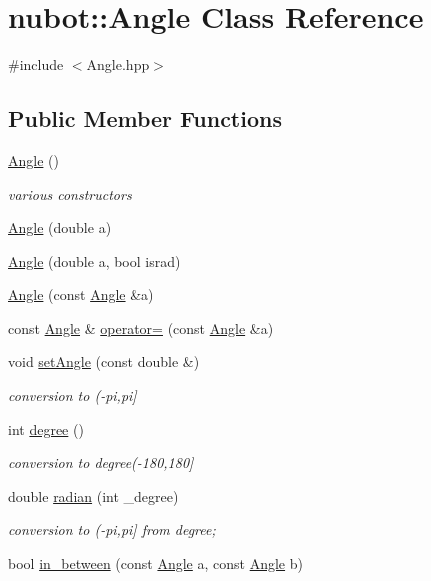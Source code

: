 \hypertarget{classnubot_1_1Angle}{\section{nubot\-:\-:Angle Class Reference}
\label{classnubot_1_1Angle}
}


{\ttfamily \#include $<$Angle.\-hpp$>$}

\subsection*{Public Member Functions}
\begin{DoxyCompactItemize}
\item 
\hyperlink{classnubot_1_1Angle_a5dfacaad5e9ae217f95f4bcfc7de2d44}{Angle} ()
\begin{DoxyCompactList}\small\item\em various constructors \end{DoxyCompactList}\item 
\hyperlink{classnubot_1_1Angle_a65d4bada1d5dfcfa82e9d8b88301ea61}{Angle} (double a)
\item 
\hyperlink{classnubot_1_1Angle_a11d992adb4281a30fa4a969872641e1c}{Angle} (double a, bool israd)
\item 
\hyperlink{classnubot_1_1Angle_ae4a2ecd3e7ee97c16f3c78f4f6a877bf}{Angle} (const \hyperlink{classnubot_1_1Angle}{Angle} \&a)
\item 
const \hyperlink{classnubot_1_1Angle}{Angle} \& \hyperlink{classnubot_1_1Angle_ac5eac9e017f5dc873bd41891640471ca}{operator=} (const \hyperlink{classnubot_1_1Angle}{Angle} \&a)
\item 
void \hyperlink{classnubot_1_1Angle_aa8eaad3a2a82d79456ed326ddbba141f}{set\-Angle} (const double \&)
\begin{DoxyCompactList}\small\item\em conversion to (-\/pi,pi\mbox{]} \end{DoxyCompactList}\item 
int \hyperlink{classnubot_1_1Angle_a832dc6642ecf10914a026bbcfd77759d}{degree} ()
\begin{DoxyCompactList}\small\item\em conversion to degree(-\/180,180\mbox{]} \end{DoxyCompactList}\item 
double \hyperlink{classnubot_1_1Angle_a15e404cb4f775dead12415927e2ee46a}{radian} (int \-\_\-degree)
\begin{DoxyCompactList}\small\item\em conversion to (-\/pi,pi\mbox{]} from degree; \end{DoxyCompactList}\item 
bool \hyperlink{classnubot_1_1Angle_ad102f17a54cbd08b0846cc1b94f3caa4}{in\-\_\-between} (const \hyperlink{classnubot_1_1Angle}{Angle} a, const \hyperlink{classnubot_1_1Angle}{Angle} b)
\end{DoxyCompactItemize}
